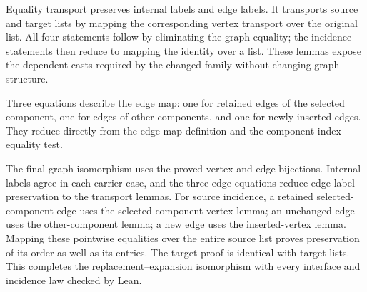 









Equality transport preserves internal labels and edge labels. It transports
source and target lists by mapping the corresponding vertex transport over
the original list. All four statements follow by eliminating the graph
equality; the incidence statements then reduce to mapping the identity
over a list. These lemmas expose the dependent casts required by the
changed family without changing graph structure.









Three equations describe the edge map: one for retained edges of the selected
component, one for edges of other components, and one for newly inserted edges. They reduce directly
from the edge-map definition and the component-index equality test.

The final graph isomorphism uses the proved vertex and edge bijections.
Internal labels agree in each carrier case, and the three edge equations
reduce edge-label preservation to the transport lemmas. For source incidence,
a retained selected-component edge uses the selected-component vertex lemma;
an unchanged edge uses the other-component lemma; a new edge uses the
inserted-vertex lemma. Mapping these pointwise equalities over the entire
source list proves preservation of its order as well as its entries.
The target proof is identical with target lists. This completes the
replacement--expansion isomorphism with every interface and incidence law
checked by Lean.





